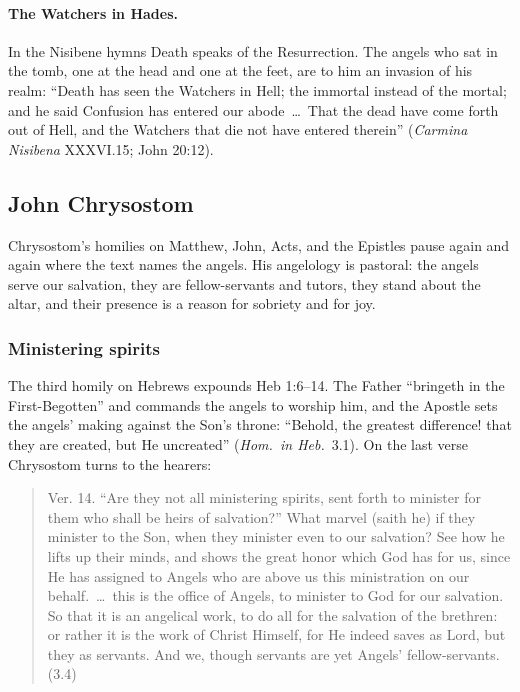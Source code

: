 \paragraph{The Watchers in Hades.} In the Nisibene hymns Death speaks
of the Resurrection. The angels who sat in the tomb, one at the head and
one at the feet, are to him an invasion of his realm: ``Death has seen
the Watchers in Hell; the immortal instead of the mortal; and he said
Confusion has entered our abode~\dots\ That the dead have come forth out
of Hell, and the Watchers that die not have entered therein'' (\emph{Carmina
Nisibena} XXXVI.15; John 20:12).

\sectionguard
\subsection{John Chrysostom}\label{sec:fb-chrysostom}

Chrysostom's homilies on Matthew, John, Acts, and the Epistles pause
again and again where the text names the angels. His angelology is
pastoral: the angels serve our salvation,
they are fellow-servants and tutors, they stand about the altar, and
their presence is a reason for sobriety and for joy.

\subsubsection{Ministering spirits}

The third homily on Hebrews expounds Heb 1:6--14. The Father ``bringeth in
the First-Begotten'' and commands the angels to worship him, and the
Apostle sets the angels' making against the Son's throne: ``Behold, the
greatest difference! that they are created, but He uncreated''
(\emph{Hom.\ in Heb.}\ 3.1). On the last verse Chrysostom turns to the
hearers:

\begin{quote}
Ver. 14. ``Are they not all ministering spirits, sent forth to minister
for them who shall be heirs of salvation?'' What marvel (saith he) if
they minister to the Son, when they minister even to our salvation? See
how he lifts up their minds, and shows the great honor which God has for
us, since He has assigned to Angels who are above us this ministration on
our behalf.~\dots\ this is the office of Angels, to minister to God for
our salvation. So that it is an angelical work, to do all for the
salvation of the brethren: or rather it is the work of Christ Himself,
for He indeed saves as Lord, but they as servants. And we, though
servants are yet Angels' fellow-servants. (3.4)
\end{quote}

